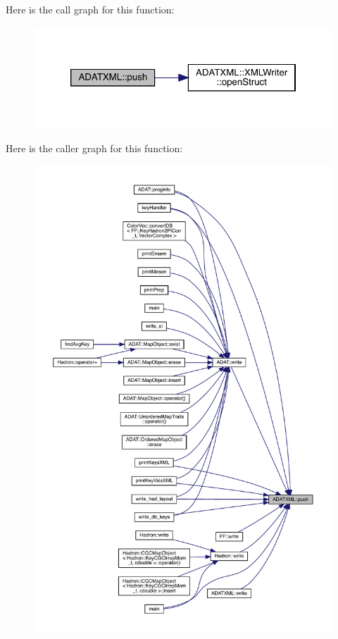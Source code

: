 Here is the call graph for this function\+:\nopagebreak
\begin{figure}[H]
\begin{center}
\leavevmode
\includegraphics[width=320pt]{d7/da0/namespaceADATXML_a1e8531ea0cb1a302d918f3b427969425_cgraph}
\end{center}
\end{figure}
Here is the caller graph for this function\+:
\nopagebreak
\begin{figure}[H]
\begin{center}
\leavevmode
\includegraphics[width=350pt]{d7/da0/namespaceADATXML_a1e8531ea0cb1a302d918f3b427969425_icgraph}
\end{center}
\end{figure}
\mbox{\label{namespaceADATXML_a569ed4d03ded383a8aaf0ce90b7c80ba}} 

